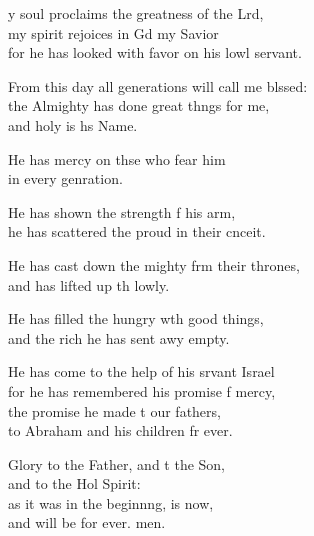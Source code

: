 \settowidth{\versewidth}{From this day all generations will call me blessed: +}
\begin{psalmverse}%
  \begin{patverse}
y soul proclaims the greatness of the Lrd,\Flex\\
my spirit rejoices in Gd my Savior\Med\\
for he has looked with favor on his lowl servant.

From this day all generations will call me blssed:\Flex\\
the Almighty has done great th\pointup{\i}ngs for me,\Med\\
and holy is h\pointup{\i}s Name.

He has mercy on thse who fear him\Med\\
in every genration.

He has shown the strength f his arm,\Med\\
he has scattered the proud in their cnceit.

He has cast down the mighty frm their thrones,\Med\\
and has lifted up th lowly.

He has filled the hungry w\pointup{\i}th good things,\Med\\
and the rich he has sent awy empty.

He has come to the help of his srvant Israel\Med\\
for he has remembered his promise f mercy,\\
the promise he made t our fathers,\Med\\
to Abraham and his children fr ever.

Glory to the Father, and t the Son,\Med\\
and to the Hol Spirit:\\
as it was in the beginn\pointup{\i}ng, is now,\Med\\
and will be for ever. men.
  \end{patverse}
\end{psalmverse}
